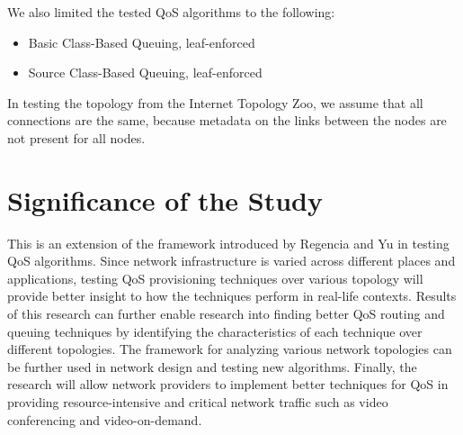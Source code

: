 We also limited the tested QoS algorithms to the following:
\begin{itemize}
    \item Basic Class-Based Queuing, leaf-enforced
    \item Source Class-Based Queuing, leaf-enforced
\end{itemize}

In testing the topology from the Internet Topology Zoo, we assume that all connections are the same, because metadata on the links between the nodes are not present for all nodes.

\section{Significance of the Study}

This is an extension of the framework introduced by Regencia and Yu in testing QoS algorithms. Since network infrastructure is varied across different places and applications, testing QoS provisioning techniques over various topology will provide better insight to how the techniques perform in real-life contexts. Results of this research can further enable research into finding better QoS routing and queuing techniques by identifying the characteristics of each technique over different topologies. The framework for analyzing various network topologies can be further used in network design and testing new algorithms. Finally, the research will allow network providers to implement better techniques for QoS in providing resource-intensive and critical network traffic such as video conferencing and video-on-demand.

